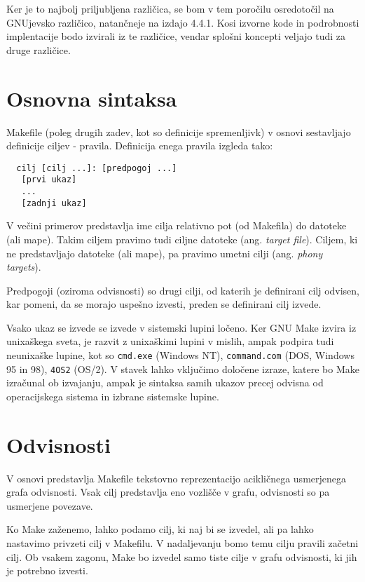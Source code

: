 \documentclass[notitlepage]{report}
\begin{document}
Ker je to najbolj priljubljena različica, se bom v tem poročilu
osredotočil na GNUjevsko različico, natančneje na izdajo 4.4.1. Kosi
izvorne kode in podrobnosti implentacije bodo izvirali iz te
različice, vendar splošni koncepti veljajo tudi za druge različice.

\section*{Osnovna sintaksa}

Makefile (poleg drugih zadev, kot so definicije spremenljivk) v osnovi
sestavljajo definicije ciljev - pravila. Definicija enega pravila
izgleda tako:

\begin{verbatim}
  cilj [cilj ...]: [predpogoj ...]
   [prvi ukaz]
   ...
   [zadnji ukaz]
\end{verbatim}

V večini primerov predstavlja ime cilja relativno pot (od Makefila)
do datoteke (ali mape). Takim ciljem pravimo tudi ciljne datoteke
(ang. \textit{target file}). Ciljem, ki ne predstavljajo datoteke (ali
mape), pa pravimo umetni cilji (ang. \textit{phony targets}).

Predpogoji (oziroma odvisnosti) so drugi cilji, od katerih je
definirani cilj odvisen, kar pomeni, da se morajo uspešno izvesti,
preden se definirani cilj izvede.

Vsako ukaz se izvede se izvede v sistemski lupini ločeno. Ker GNU Make
izvira iz unixaškega sveta, je razvit z unixaškimi lupini v mislih,
ampak podpira tudi neunixaške lupine, kot so \verb|cmd.exe| (Windows
NT), \verb|command.com| (DOS, Windows 95 in 98), \verb|4OS2| (OS/2). V
stavek lahko vključimo določene izraze, katere bo Make izračunal ob
izvajanju, ampak je sintaksa samih ukazov precej odvisna od
operacijskega sistema in izbrane sistemske lupine.

\section*{Odvisnosti}

V osnovi predstavlja Makefile tekstovno reprezentacijo acikličnega
usmerjenega grafa odvisnosti. Vsak cilj predstavlja eno vozlišče v
grafu, odvisnosti so pa usmerjene povezave.

Ko Make zaženemo, lahko podamo cilj, ki naj bi se izvedel, ali pa
lahko nastavimo privzeti cilj v Makefilu. V nadaljevanju bomo temu
cilju pravili začetni cilj. Ob vsakem zagonu, Make bo izvedel samo
tiste cilje v grafu odvisnosti, ki jih je potrebno izvesti.
\end{document}
